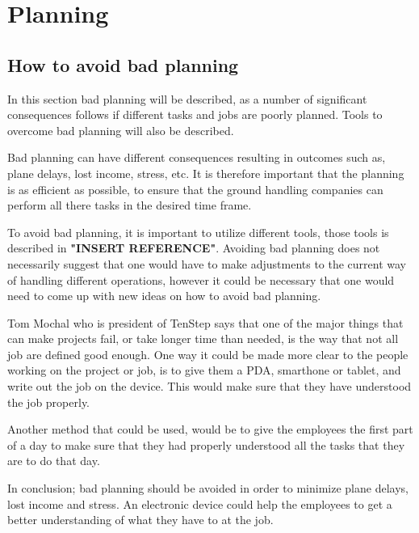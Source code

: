 \chapter{Planning}
\section{How to avoid bad planning}
In this section bad planning will be described, as a number of significant consequences follows if different tasks and jobs are poorly planned. Tools to overcome bad planning will also be described.

Bad planning can have different consequences resulting in outcomes such as, plane delays, lost income, stress, etc. It is therefore important that the planning is as efficient as possible, to ensure that the ground handling companies can perform all there tasks in the desired time frame.

To avoid bad planning, it is important to utilize different tools, those  tools is described in \textbf{"INSERT REFERENCE"}. Avoiding bad planning does not necessarily suggest that one would have to make adjustments to the current way of handling different operations, however it could be necessary that one would need to come up with new ideas on how to avoid bad planning.

Tom Mochal who is president of TenStep \cite{AvoidP_TenStep} says that one of the major things that can make projects fail, or take longer time than needed, is the way that not all job are defined good enough. One way it could be made more clear to the people working on the project or job, is to give them a PDA, smarthone or tablet, and write out the job on the device. This would make sure that they have understood the job properly.


Another method that could be used, would be to give the employees the first part of a day to make sure that they had properly understood all the tasks that they are to do that day.

In conclusion; bad planning should be avoided in order to minimize plane delays, lost income and stress. An electronic device could help the employees to get a better understanding of what they have to at the job. 
